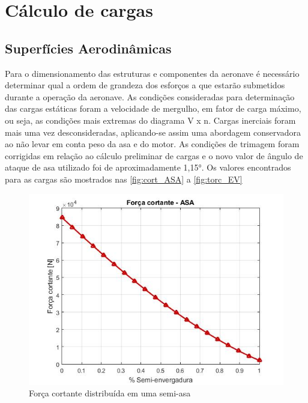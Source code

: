\chapter{Cálculo de cargas}


\section{Superfícies Aerodinâmicas}

Para o dimensionamento das estruturas e componentes da aeronave é necessário determinar qual a ordem de grandeza dos esforços a que estarão submetidos durante a operação da aeronave. As condições consideradas para determinação das cargas estáticas foram a velocidade de mergulho, em fator de carga máximo, ou seja, as condições mais extremas do diagrama V x n. Cargas inerciais foram mais uma vez desconsideradas, aplicando-se assim uma abordagem conservadora ao não levar em conta peso da asa e do motor.
As condições de trimagem foram corrigidas em relação ao cálculo preliminar de cargas e o novo valor de ângulo de ataque de asa utilizado foi de aproximadamente 1,15°.
Os valores encontrados para as cargas são mostrados nas \autoref{fig:cort_ASA} a \autoref{fig:torc_EV}

\begin{figure}
\centering
\includegraphics[width=\textwidth]{cargas/imagens/cort_ASA.JPG}
\caption{Força cortante distribuída em uma semi-asa}
\label{fig:cort_ASA}
\end{figure}

